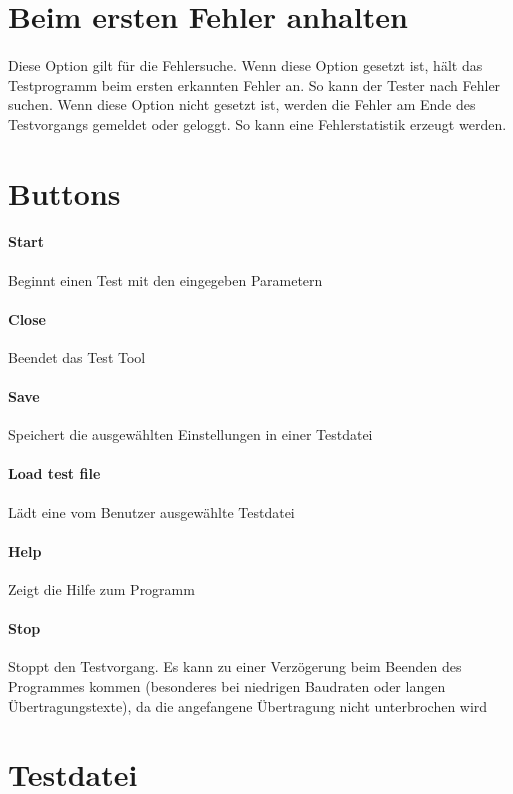 \section{Beim ersten Fehler anhalten}
\paragraph{}
Diese Option gilt für die Fehlersuche. Wenn diese Option gesetzt ist, hält das Testprogramm beim ersten erkannten Fehler an. So kann der Tester nach Fehler suchen. Wenn diese Option nicht gesetzt ist, werden die Fehler am Ende des Testvorgangs gemeldet oder geloggt. So kann eine Fehlerstatistik erzeugt werden.


\section{Buttons}
\paragraph{Start} Beginnt einen Test mit den eingegeben Parametern
\paragraph{Close} Beendet das Test Tool
\paragraph{Save} Speichert die ausgewählten Einstellungen in einer Testdatei
\paragraph{Load test file} Lädt eine vom Benutzer ausgewählte Testdatei
\paragraph{Help} Zeigt die Hilfe zum Programm
\paragraph{Stop} Stoppt den Testvorgang. Es kann zu einer Verzögerung beim Beenden des Programmes kommen (besonderes bei niedrigen Baudraten oder langen Übertragungstexte), da die angefangene Übertragung nicht unterbrochen wird



\section{Testdatei}
